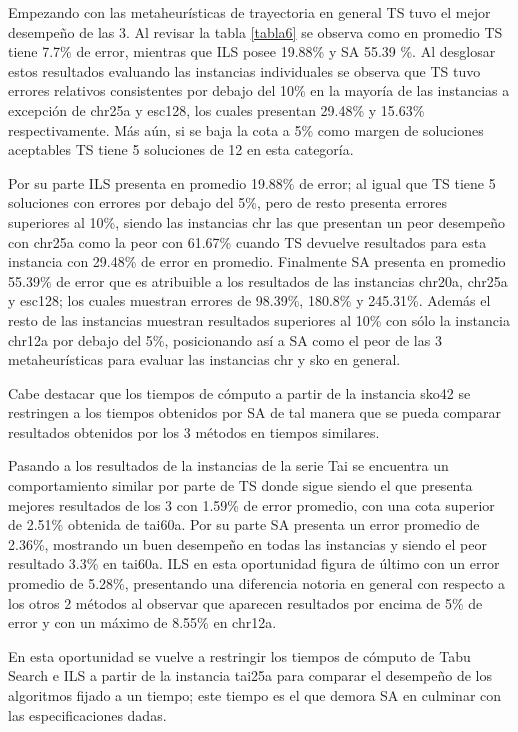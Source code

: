 \documentclass{ci5652}
\begin{document}
Empezando con las metaheurísticas de trayectoria en general TS tuvo el mejor desempeño de las 3. Al revisar la tabla \ref{tabla6} se observa como en promedio TS tiene 7.7\% de error, mientras que ILS posee 19.88\% y SA 55.39 \%. Al desglosar estos resultados evaluando las instancias individuales se observa que TS tuvo errores relativos consistentes por debajo del 10\% en la mayoría de las instancias a excepción de chr25a y esc128, los cuales presentan 29.48\% y 15.63\% respectivamente. Más aún, si se baja la cota a 5\% como margen de soluciones aceptables TS tiene 5 soluciones de 12 en esta categoría.

Por su parte ILS presenta en promedio 19.88\% de error; al igual que TS tiene 5 soluciones con errores por debajo del 5\%, pero de resto presenta errores superiores al 10\%, siendo las instancias chr las que presentan un peor desempeño con chr25a como la peor con 61.67\% cuando TS devuelve resultados para esta instancia con 29.48\% de error en promedio. Finalmente SA presenta en promedio 55.39\% de error que es atribuible a los resultados de las instancias chr20a, chr25a y esc128; los cuales muestran errores de 98.39\%, 180.8\% y 245.31\%. Además el resto de las instancias muestran resultados superiores al 10\% con sólo la instancia chr12a por debajo del 5\%, posicionando así a SA como el peor de las 3 metaheurísticas para evaluar las instancias chr y sko en general. 

Cabe destacar que los tiempos de cómputo a partir de la instancia sko42 se restringen a los tiempos obtenidos por SA de tal manera que se pueda comparar resultados obtenidos por los 3 métodos en tiempos similares. 

Pasando a los resultados de la instancias de la serie Tai se encuentra un comportamiento similar por parte de TS donde sigue siendo el que presenta mejores resultados de los 3 con 1.59\% de error promedio, con una cota superior de 2.51\% obtenida de tai60a. Por su parte SA presenta un error promedio de 2.36\%, mostrando un buen desempeño en todas las instancias y siendo el peor resultado 3.3\% en tai60a. ILS en esta oportunidad figura de último con un error promedio de 5.28\%, presentando una diferencia notoria en general con respecto a los otros 2 métodos al observar que aparecen resultados por encima de 5\% de error y con un máximo de 8.55\% en chr12a.

En esta oportunidad se vuelve a restringir los tiempos de cómputo de Tabu Search e ILS a partir de la instancia tai25a para comparar el desempeño de los algoritmos fijado a un tiempo; este tiempo es el que demora SA en culminar con las especificaciones dadas.
\end{document}
